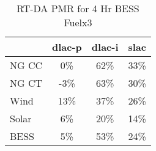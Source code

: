 \begin{table}[htbp]
\centering
\begin{tabular}{lccc}
\toprule
\hline
 & dlac-p & dlac-i & slac \\
\hline
\quad NG CC & 0\% & 62\% & 33\% \\
\quad NG CT & -3\% & 63\% & 30\% \\
\quad Wind & 13\% & 37\% & 26\% \\
\quad Solar & 6\% & 20\% & 14\% \\
\quad BESS & 5\% & 53\% & 24\% \\
\hline
\bottomrule
\end{tabular}
\caption{RT-DA PMR for 4 Hr BESS Fuelx3}
\label{tab:table4_4_Hr_BESS_Fuelx3}
\end{table}
